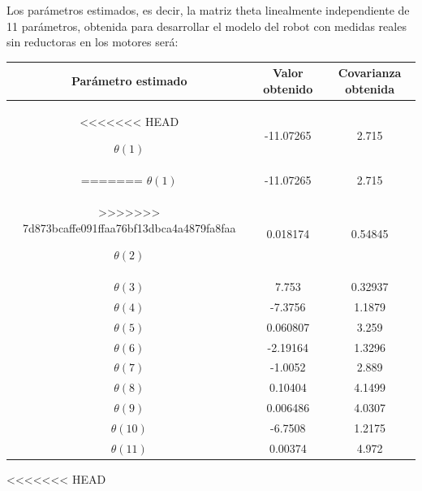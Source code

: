 Los parámetros estimados, es decir, la matriz theta linealmente independiente de 11 parámetros, obtenida para desarrollar el modelo del robot con medidas reales sin reductoras en los motores será:

\begin{center}
	
	\begin{tabular}{| c | c | c |}
		
		
		
		\hline
		
		Parámetro estimado & Valor obtenido & Covarianza obtenida \\
		
		\hline
<<<<<<< HEAD
		
		$\theta(1) $ & -11.07265 & 2.715 \\
		
=======
		$\theta(1) $ & -11.07265 & 2.715 \\
>>>>>>> 7d873bcaffe091ffaa76bf13dbca4a4879fa8faa
		\hline
		
		$\theta(2) $ & 0.018174 & 0.54845 \\
		
		\hline
		
		$\theta(3) $ & 7.753 & 0.32937 \\
		
		\hline
		
		$\theta(4) $ & -7.3756 & 1.1879 \\
		
		\hline
		
		$\theta(5) $ & 0.060807 & 3.259 \\
		
		\hline
		
		$\theta(6) $ & -2.19164 & 1.3296 \\
		
		\hline
		
		$\theta(7) $ & -1.0052 & 2.889 \\
		
		\hline
		
		$\theta(8) $ & 0.10404 & 4.1499 \\
		
		\hline
		
		$\theta(9) $ & 0.006486 & 4.0307 \\
		
		\hline
		
		$\theta(10) $ & -6.7508 & 1.2175 \\
		
		\hline
		
		$\theta(11) $ & 0.00374 & 4.972 \\
		
		\hline
		
	\end{tabular}
	
\end{center}
<<<<<<< HEAD

